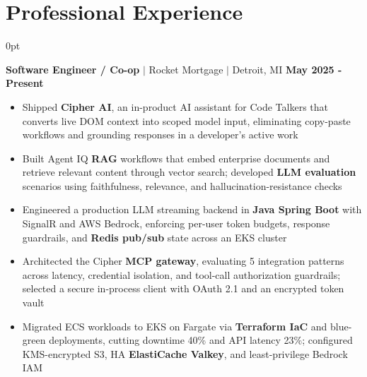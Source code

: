 \documentclass[letterpaper,10pt]{article}
\newlength{\contentindent}
\newcommand{\sectioncontent}[1]{%
  \begin{adjustwidth}{\contentindent}{0pt}%
  #1%
  \end{adjustwidth}%
}
\begin{document}
\section{Professional Experience}
\sectioncontent{
\textbf{Software Engineer / Co-op} $|$
Rocket Mortgage $|$
Detroit, MI \hfill \textbf{May 2025 - Present}
\begin{itemize}
    \item Shipped \textbf{Cipher AI}, an in-product AI assistant for Code Talkers that converts live DOM context into scoped model input, eliminating copy-paste workflows and grounding responses in a developer's active work
    \item Built Agent IQ \textbf{RAG} workflows that embed enterprise documents and retrieve relevant content through vector search; developed \textbf{LLM evaluation} scenarios using faithfulness, relevance, and hallucination-resistance checks
    \item Engineered a production LLM streaming backend in \textbf{Java Spring Boot} with SignalR and AWS Bedrock, enforcing per-user token budgets, response guardrails, and \textbf{Redis pub/sub} state across an EKS cluster
    \item Architected the Cipher \textbf{MCP gateway}, evaluating 5 integration patterns across latency, credential isolation, and tool-call authorization guardrails; selected a secure in-process client with OAuth 2.1 and an encrypted token vault
    \item Migrated ECS workloads to EKS on Fargate via \textbf{Terraform IaC} and blue-green deployments, cutting downtime 40\% and API latency 23\%; configured KMS-encrypted S3, HA \textbf{ElastiCache Valkey}, and least-privilege Bedrock IAM
\end{itemize}

}
\end{document}
